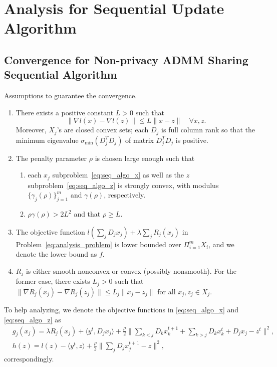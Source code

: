 \section{Analysis for Sequential Update Algorithm}
\subsection{Convergence for Non-privacy ADMM Sharing Sequential Algorithm}
\begin{assume}\label{theo:assumptions_seq}
Assumptions to guarantee the convergence. 
\begin{enumerate}
    \item There exists a positive constant $L>0$ such that 
        \[
            \|\nabla l(x)-\nabla l(z)\| \le L\|x-z\|\quad \forall x, z.
        \]
        Moreover, $X_j$'s are closed convex sets; each $D_j$ is full column rank so that the minimum eigenvalue $\sigma_{\text{min}}(D^T_jD_j)$ of matrix $D^T_jD_j$ is positive.\label{item:assum_1_seq}
    \item The penalty parameter $\rho$ is chosen large enough such that
    \begin{enumerate}
        \item each $x_j$ subproblem~\eqref{eq:seq_algo_x} as well as the $z$ subproblem~\eqref{eq:seq_algo_z} is strongly convex, with modulus $\{\gamma_j(\rho)\}_{j=1}^m$ and $\gamma(\rho)$, respectively. \label{item:asusum_2_1_seq}
        \item $\rho\gamma(\rho)>2L^2$ and that $\rho\ge L$.
    \end{enumerate}
    \label{item:assum_2_seq}
    \item The objective function $l\left(\sum_j D_jx_j\right) + \lambda\sum_j R_j(x_j)$ in Problem~\ref{eq:analysis_problem} is lower bounded over $\Pi_{i=1}^mX_i$, and we denote the lower bound as $\underline{f}$.\label{item:assum_3_seq}
    \item $R_j$ is either smooth nonconvex or convex (possibly nonsmooth). For the former case, there exists $L_j>0$ such that $\|\nabla R_j(x_j) - \nabla R_j(z_j)\|\le L_j\|x_j-z_j\|$ for all $x_j, z_j\in X_j$.\label{item:asssum_4_seq}
\end{enumerate}
\end{assume}
To help analyzing, we denote the objective functions in \eqref{eq:seq_algo_x} and \eqref{eq:seq_algo_z} as 
\begin{align}
    & g_j(x_j) = \lambda R_j(x_j) + \langle y^t, D_jx_j\rangle + \frac{\rho}{2}\big\|\sum_{k<j}D_kx_k^{t+1} + \sum_{k>j}D_kx_k^t + D_jx_j - z^t\big\|^2,\nonumber\\
    & h(z) = l(z)  - \langle y^t, z \rangle + \frac{\rho}{2} \big\|\sum_jD_jx_j^{t+1} - z\big\|^2,
\end{align}
correspondingly. 

